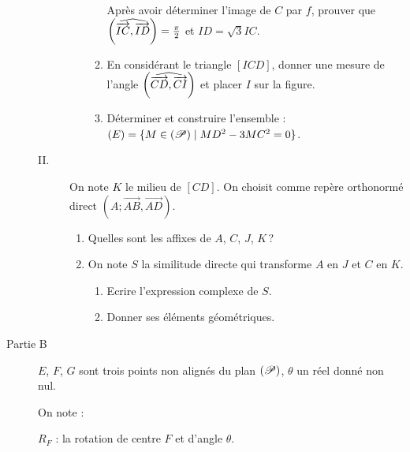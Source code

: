 \begin{description}
\begin{description}
\begin{enumerate}
\begin{enumerate}
                                                      Apr\`es avoir d\'eterminer l'image de $C$ par $f$, 
                                                      prouver que $\Angl{IC}{ID} = \frac{\pi}{2}$ et $ID = \sqrt{3} IC$.
                                                \item En consid\'erant le triangle $[ICD]$, donner une mesure de l'angle
                                                      $\left( \widehat{ \overrightarrow{CD} , \overrightarrow{CI} } \right)$ et placer $I$ sur la figure.
                                                \item D\'eterminer et construire l'ensemble : 
                                                      $(E) = \{ M \in (\mathscr{P}) \mid MD^2 - 3 MC^2 = 0 \}$.
                                          \end{enumerate}
                              \end{enumerate}
                        \item[II. ]
                              On note $K$ le milieu de $[CD]$. 
                              On choisit comme rep\`ere orthonorm\'e direct $(A;\overrightarrow{AB},\overrightarrow{AD})$.
                              \begin{enumerate}
                                    \item Quelles sont les affixes de $A$, $C$, $J$, $K$\,?
                                    \item On note $S$ la similitude directe qui transforme $A$ en $J$ et $C$ en $K$.
                                          \begin{enumerate}
                                                \item Ecrire l'expression complexe de $S$.
                                                \item Donner ses \'el\'ements g\'eom\'etriques.
                                          \end{enumerate}
                              \end{enumerate}
                  \end{description}
            \item[Partie B]
                  $E$, $F$, $G$ sont trois points non align\'es du plan $(\mathscr{P})$, $\theta$ un r\'eel donn\'e non nul.
                        \begin{mitanisa}
                              On note : 
                                    \begin{mitanisa}
                                          $R_F$ : la rotation de centre $F$ et d'angle $\theta$. \\

\end{mitanisa}
\end{mitanisa}
\end{description}
